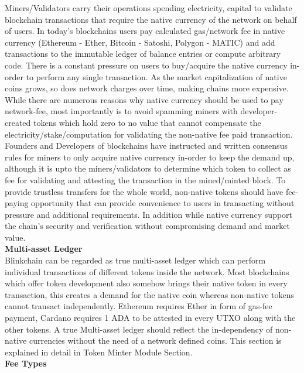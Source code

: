\documentclass[letterpaper,11pt]{article}
\begin{document}
Miners/Validators carry their operations spending electricity, capital to validate blockchain transactions that require the native currency of the network on behalf of users. In today's blockchains users pay calculated gas/network fee in native currency (Ethereum - Ether, Bitcoin - Satoshi, Polygon - MATIC) and add transactions to the immutable ledger of balance entries or compute arbitrary code. There is a constant pressure on users to buy/acquire the native currency in-order to perform any single transaction. As the market capitalization of native coins grows, so does network charges over time, making chains more expensive. While there are numerous reasons why native currency should be used to pay network-fee, most importantly is to avoid spamming miners with developer-created tokens which hold zero to no value that cannot compensate the electricity/stake/computation for validating the non-native fee paid transaction. Founders and Developers of blockchains have instructed and written consensus rules for miners to only acquire native currency in-order to keep the demand up, although it is upto the miners/validators to determine which token to collect as fee for validating and attesting the transaction in the mined/minted block. To provide trustless transfers for the whole world, non-native tokens should have fee-paying opportunity that can provide convenience to users in transacting without pressure and additional requirements. In addition while native currency support the chain's security and verification without compromising demand and market value.\\

\textbf{Multi-asset Ledger}\\

Blinkchain can be regarded as true multi-asset ledger which can perform individual transactions of different tokens inside the network. Most blockchains which offer token development also somehow brings their native token in every transaction, this creates a demand for the native coin whereas non-native tokens cannot transact independently. Ethereum requires Ether in form of gas-fee payment, Cardano requires 1 ADA to be attested in every UTXO along with the other tokens. A true Multi-asset ledger should reflect the in-dependency of non-native currencies without the need of a network defined coins. This section is explained in detail in Token Minter Module Section.\\

\textbf{Fee Types}\\
\end{document}
